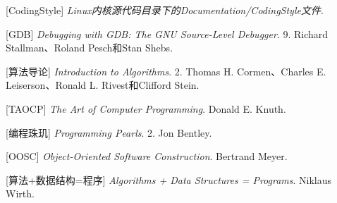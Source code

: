 \begin{BookBibliographyEntry}

[CodingStyle] \emph{Linux内核源代码目录下的Documentation/\BookSplit{}CodingStyle文件}.

\end{BookBibliographyEntry}

\begin{BookBibliographyEntry}

[GDB] \emph{Debugging with GDB:\BookSplit{} The GNU Source-Level Debugger}. 9.\BookSplit{} Richard Stallman、Roland Pesch和Stan Shebs.

\end{BookBibliographyEntry}

\begin{BookBibliographyEntry}

[算法导论] \emph{Introduction to Algorithms}. 2.\BookSplit{} Thomas H.\BookSplit{} Cormen、Charles E.\BookSplit{} Leiserson、Ronald L.\BookSplit{} Rivest和Clifford Stein.

\end{BookBibliographyEntry}

\begin{BookBibliographyEntry}

[TAOCP] \emph{The Art of Computer Programming}. Donald E.\BookSplit{} Knuth.

\end{BookBibliographyEntry}

\begin{BookBibliographyEntry}

[编程珠玑] \emph{Programming Pearls}. 2.\BookSplit{} Jon Bentley.

\end{BookBibliographyEntry}

\begin{BookBibliographyEntry}

[OOSC] \emph{Object-Oriented Software Construction}. Bertrand Meyer.

\end{BookBibliographyEntry}

\begin{BookBibliographyEntry}

[算法+数据结构=程序] \emph{Algorithms + Data Structures = Programs}. Niklaus Wirth.

\end{BookBibliographyEntry}

